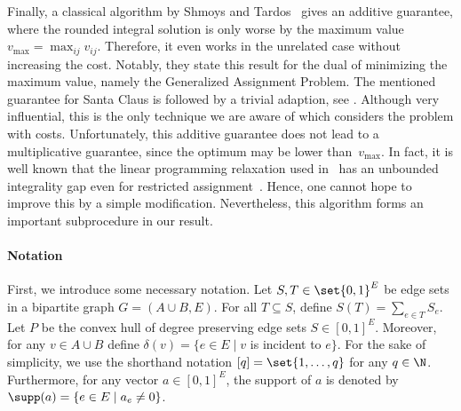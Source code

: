 Finally, a classical algorithm by Shmoys and Tardos~\cite{ShmoysT93}
gives an additive guarantee, where the rounded integral solution
is only worse by the maximum value $v_{\max} = \max_{ij} v_{ij}$.
Therefore, it even works in the unrelated case without increasing
the cost. Notably, they state this result for
the dual of minimizing the maximum value, namely the Generalized Assignment Problem.
The mentioned guarantee for Santa Claus is followed by a trivial
adaption, see .
Although very influential, this is the only technique we are
aware of which considers the problem with costs.
Unfortunately, this additive guarantee does not lead
to a multiplicative guarantee, since the optimum may be lower
than~$v_{\max}$. In fact, it is well known that the linear 
programming relaxation used in~\cite{ShmoysT93} has an unbounded
integrality gap even for restricted assignment~\cite{BansalS06}. Hence, one
cannot hope to improve this by a simple modification.
Nevertheless, this algorithm forms an important subprocedure in our result.

\paragraph*{Notation}


First, we introduce some necessary notation. Let $S,T \in \set{0,1}^E$ be edge sets in a bipartite graph $G = (A\cup B, E)$.
For all $T \subseteq S$, define $S(T) = \sum_{e \in T} S_e$. 
Let $P$ be the convex hull of degree preserving edge sets $S \in [0,1]^E$. Moreover, for any $v \in A\cup B$ define $\delta(v) = \{e \in E \mid v$ is incident to $e\}$. For the sake of simplicity, we use the shorthand notation $[q] = \set{1, \dotsc, q}$ for any $q \in \N$. Furthermore, for any vector $a \in [0, 1]^E$, the support of $a$ is denoted by $\supp(a) = \{e \in E \mid a_e \neq 0 \}$.